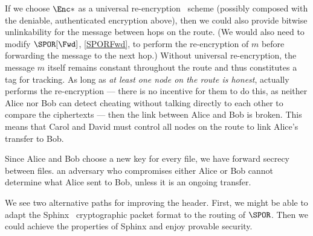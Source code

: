 If we choose \(\Enc*\) as a universal re-encryption~\cite{UniversalReencryption} 
scheme (possibly composed with the deniable, authenticated encryption above), 
then we could also provide bitwise unlinkability for the message between hops on 
the route.
(We would also need to modify \(\SPOR[\Fwd]\), \cref{SPORFwd}, to perform the 
re-encryption of \(m\) before forwarding the message to the next hop.)
Without universal re-encryption, the message \(m\) itself remains constant 
throughout the route and thus constitutes a tag for tracking.
As long as \emph{at least one node on the route is honest}, \ie actually 
performs the re-encryption --- there is no incentive for them to do this, as 
neither Alice nor Bob can detect cheating without talking directly to each other 
to compare the ciphertexts --- then the link between Alice and Bob is broken.
This means that Carol and David must control all nodes on the route to link 
Alice's transfer to Bob.

Since Alice and Bob choose a new key for every file, we have forward secrecy 
between files.
\Eg an adversary who compromises either Alice or Bob cannot determine what Alice 
sent to Bob, unless it is an ongoing transfer.





We see two alternative paths for improving the header.
First, we might be able to adapt the Sphinx~\cite{Sphinx} cryptographic packet 
format to the routing of \(\SPOR\).
Then we could achieve the properties of Sphinx and enjoy provable security.

